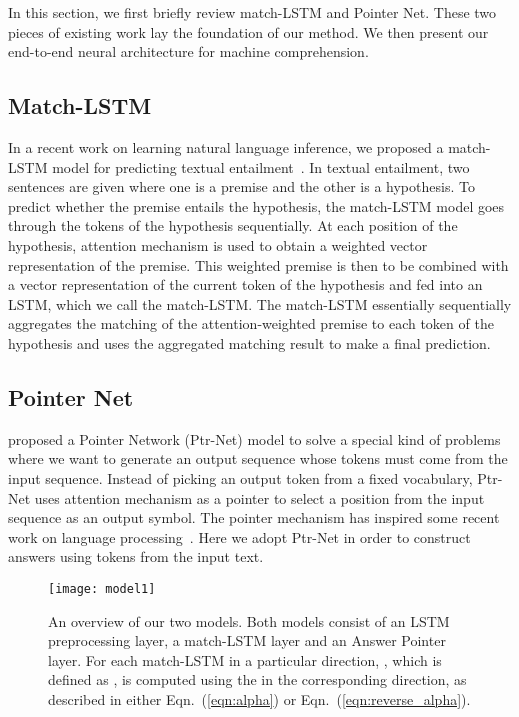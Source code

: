 \documentclass{article} \usepackage{iclr2017_conference,times}
\begin{document}
In this section, we first briefly review match-LSTM and Pointer Net.
These two pieces of existing work lay the foundation of our method.
We then present our end-to-end neural architecture for machine comprehension.

\subsection{Match-LSTM}

In a recent work on learning natural language inference, we proposed a match-LSTM model for predicting textual entailment~\citep{wang2015learning:NAACL2016}.
In textual entailment, two sentences are given where one is a premise and the other is a hypothesis.
To predict whether the premise entails the hypothesis, the match-LSTM model goes through the tokens of the hypothesis sequentially.
At each position of the hypothesis, attention mechanism is used to obtain a weighted vector representation of the premise.
This weighted premise is then to be combined with a vector representation of the current token of the hypothesis and fed into an LSTM, which we call the match-LSTM. 
The match-LSTM essentially sequentially aggregates the matching of the attention-weighted premise to each token of the hypothesis and uses the aggregated matching result to make a final prediction.


\subsection{Pointer Net}

\citet{vinyals2015pointer:NIPS2015} proposed a Pointer Network (Ptr-Net) model to solve a special kind of problems where we want to generate an output sequence whose tokens must come from the input sequence.
Instead of picking an output token from a fixed vocabulary, Ptr-Net uses attention mechanism as a pointer to select a position from the input sequence as an output symbol.
The pointer mechanism has inspired some recent work on language processing~\citep{gu2016copynet, kadlec2016text:ACL2016}.
Here we adopt Ptr-Net in order to construct answers using tokens from the input text.

\begin{figure}[]
\centering
\texttt{[image: model1]}
\caption{An overview of our two models. 
Both models consist of an LSTM preprocessing layer, a match-LSTM layer and an Answer Pointer layer. For each match-LSTM in a particular direction, , which is defined as , is computed using the  in the corresponding direction, as described in either Eqn.~(\ref{eqn:alpha}) or Eqn.~(\ref{eqn:reverse_alpha}).}
\label{fig:model}
\end{figure}
\end{document}
